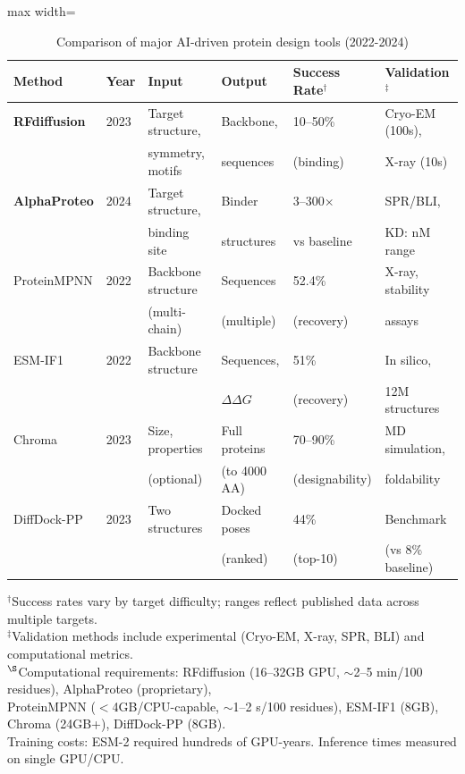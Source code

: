 \begin{table}[h]
\centering
\caption{Comparison of major AI-driven protein design tools (2022-2024)}
\label{tab:design_tools}
\small
\begin{adjustbox}{max width=\textwidth}
\begin{tabular}{@{}llllll@{}}
\toprule
\textbf{Method} & \textbf{Year} & \textbf{Input} & \textbf{Output} & \textbf{Success Rate}$^\dagger$ & \textbf{Validation}$^\ddagger$ \\
\midrule
\textbf{RFdiffusion} & 2023 & Target structure, & Backbone, & 10--50\% & Cryo-EM (100s), \\
& & symmetry, motifs & sequences & (binding) & X-ray (10s) \\
\addlinespace
\textbf{AlphaProteo} & 2024 & Target structure, & Binder & 3--300$\times$ & SPR/BLI, \\
& & binding site & structures & vs baseline & KD: nM range \\
\addlinespace
ProteinMPNN & 2022 & Backbone structure & Sequences & 52.4\% & X-ray, stability \\
& & (multi-chain) & (multiple) & (recovery) & assays \\
\addlinespace
ESM-IF1 & 2022 & Backbone structure & Sequences, & 51\% & In silico, \\
& & & $\Delta\Delta G$ & (recovery) & 12M structures \\
\addlinespace
Chroma & 2023 & Size, properties & Full proteins & 70--90\% & MD simulation, \\
& & (optional) & (to 4000 AA) & (designability) & foldability \\
\addlinespace
DiffDock-PP & 2023 & Two structures & Docked poses & 44\% & Benchmark \\
& & & (ranked) & (top-10) & (vs 8\% baseline) \\
\bottomrule
\end{tabular}
\end{adjustbox}
\begin{flushleft}
\footnotesize{$^\dagger$Success rates vary by target difficulty; ranges reflect published data across multiple targets.}\\
\footnotesize{$^\ddagger$Validation methods include experimental (Cryo-EM, X-ray, SPR, BLI) and computational metrics.}\\
\footnotesize{$^\S$Computational requirements: RFdiffusion (16--32GB GPU, $\sim$2--5 min/100 residues), AlphaProteo (proprietary),}\\
\footnotesize{\hspace{2.3cm}ProteinMPNN ($<$4GB/CPU-capable, $\sim$1--2 s/100 residues), ESM-IF1 (8GB), Chroma (24GB+), DiffDock-PP (8GB).}\\
\footnotesize{\hspace{2.3cm}Training costs: ESM-2 required hundreds of GPU-years. Inference times measured on single GPU/CPU.}
\end{flushleft}
\end{table}

